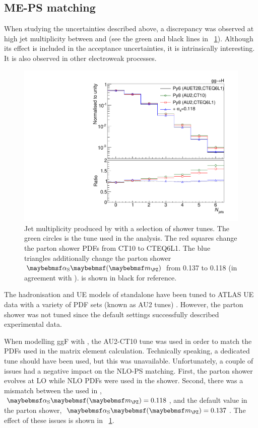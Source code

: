\subsection{ME-PS matching}
\label{sec:ggF:meps_matching}

When studying the uncertainties described above, a discrepancy was observed at high jet 
multiplicity between  and  (see 
the green and black lines in \Figure~\ref{fig:signal:matching}). Although its effect is 
included in the acceptance uncertainties, it is intrinsically interesting. It is also 
observed in other electroweak processes.

\begin{figure}[t]
	\includegraphics[width=\smallfigwidth]{tex/signal/matching}
	\caption{Jet multiplicity produced by  with a selection 
	of shower tunes. The green circles is the tune used in the analysis. The red squares 
	change the parton shower PDFs from CT10 to CTEQ6L1. The blue triangles additionally 
	change the parton shower $\alphaS\parenths{\mZ}$ from 0.137 to 0.118 (in agreement 
	with \powhegbox).  is shown in black for reference.}
	\label{fig:signal:matching}
\end{figure}

The hadronisation and UE models of standalone  have been tuned to ATLAS 
UE data with a variety of PDF sets (known as AU2 tunes) \cite{ATLAS:tune:2012}.
However, the parton shower was not tuned since the default settings successfully described 
experimental data. 

When modelling ggF with \powhegbox, the AU2-CT10 tune was used in order to match the 
PDFs used in the matrix element calculation. Technically speaking, a dedicated 
 tune should have been used, but this was unavailable. 
Unfortunately, a couple of issues had a negative impact on the NLO-PS matching. First, 
the parton shower evolves \alphaS at LO while NLO PDFs were used in the shower. 
Second, there was a mismatch between the \alphaS used in \powhegbox, 
$\alphaS\parenths{\mZ} = 0.118$, and the default value in the parton shower, 
$\alphaS\parenths{\mZ} = 0.137$. The effect of these issues is shown in 
\Figure~\ref{fig:signal:matching}.


